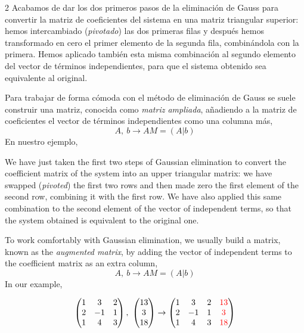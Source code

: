 \begin{paracol}{2}
Acabamos de dar los dos primeros pasos de la eliminación de Gauss para convertir la matriz de coeficientes del sistema en una matriz triangular superior: hemos intercambiado (\emph{pivotado}) las dos primeras filas y después hemos transformado en cero el primer elemento de la segunda fila, combinándola con la primera. Hemos aplicado también esta misma combinación al segundo elemento del vector de términos independientes, para que el sistema obtenido sea equivalente al original.

Para trabajar de forma cómoda con el método de eliminación de Gauss se suele construir una matriz, conocida como \emph{matriz ampliada}, añadiendo a la matriz de coeficientes el vector de términos independientes como una columna más,
\begin{equation*}
A,\ b \rightarrow AM=(A\vert b)
\end{equation*}
En nuestro ejemplo,

\switchcolumn
We have just taken the first two steps of Gaussian elimination to convert the coefficient matrix of the system into an upper triangular matrix: we have swapped (\emph{pivoted}) the first two rows and then made zero the first element of the second row, combining it with the first row. We have also applied this same combination to the second element of the vector of independent terms, so that the system obtained is equivalent to the original one.

To work comfortably with Gaussian elimination, we usually build a matrix, known as the \emph{augmented matrix}, by adding the vector of independent terms to the coefficient matrix as an extra column,
\begin{equation*}
A,\ b \rightarrow AM=(A\vert b)
\end{equation*}
In our example,
\end{paracol}

\begin{equation*}
\begin{pmatrix}
1& 3& 2\\
2& -1& 1\\
1& 4& 3
\end{pmatrix},\ \begin{pmatrix}
13\\
3\\
18
\end{pmatrix} \rightarrow
\begin{pmatrix}
1& 3& 2& {\color{red}13}\\
2& -1& 1& {\color{red}3}\\
1& 4& 3& {\color{red}18}
\end{pmatrix}
\end{equation*}

